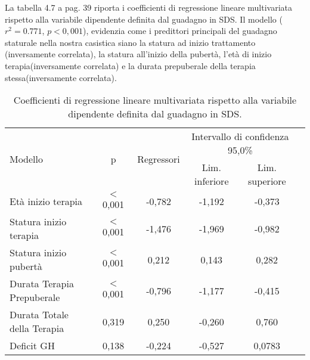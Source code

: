 La tabella 4.7 a pag. 39 riporta i coefficienti di regressione lineare multivariata rispetto alla variabile dipendente definita dal guadagno in SDS.
Il modello ($r^2 = 0.771$, $p < 0,001$), evidenzia come i predittori principali del guadagno staturale nella nostra casistica siano la statura ad inizio trattamento (inversamente correlata), la statura all'inizio della pubertà, l'età di inizio terapia(inversamente correlata) e la durata prepuberale della terapia stessa(inversamente correlata).

\begin{table}[!h]
\begin{center}
\addtolength{\tabcolsep}{-2pt}
\begin{tabular}{l c c c c c}
\toprule
\multirow{2}{*}{Modello}	& \multirow{2}{*}{p} & \multirow{2}{*}{Regressori} & \multicolumn{2}{c}{Intervallo di confidenza 95,0\%} \\
\cmidrule(r){4-5}
				& 		&	& Lim. inferiore & Lim. superiore \\
\midrule                	                	
Età inizio terapia		& $<$ 0,001	&-0,782	& -1,192  & -0,373 \\
Statura inizio terapia		& $<$ 0,001	&-1,476	& -1,969  & -0,982 \\
Statura inizio pubertà		& $<$ 0,001	& 0,212	& 0,143	  & 0,282 \\
Durata Terapia Prepuberale	& $<$ 0,001	&-0,796	& -1,177  & -0,415 \\
Durata Totale della Terapia	& 0,319		& 0,250	& -0,260  & 0,760 \\
Deficit GH			& 0,138		&-0,224	& -0,527  & 0,0783 \\ 
\bottomrule
\end{tabular} 
\end{center}
\caption{Coefficienti di regressione lineare multivariata rispetto alla variabile dipendente definita dal guadagno in SDS.}
\label{tab:Statistiche}
\end{table}


